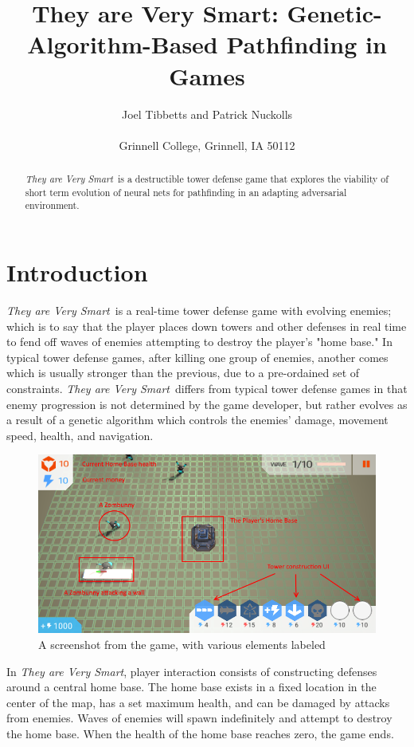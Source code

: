 \documentclass[letterpaper]{article}
\title{They are Very Smart: Genetic-Algorithm-Based Pathfinding in Games}
\author{Joel Tibbetts and Patrick Nuckolls\\
\mbox{}\\
Grinnell College, Grinnell, IA 50112 \\
} %
\def\tavs{\textit{They are Very Smart}}
\begin{document}
\maketitle

\begin{abstract}
\tavs~is a destructible tower defense game that explores the viability of short term evolution of neural nets for pathfinding in an adapting adversarial environment.
\end{abstract}

\section{Introduction}
\tavs~is a real-time tower defense game with evolving enemies; which is to say that the player places down towers and other defenses in real time to fend off waves of enemies attempting to destroy the player's "home base." In typical tower defense games, after killing one group of enemies, another comes which is usually stronger than the previous, due to a pre-ordained set of constraints. \tavs~differs from typical tower defense games in that enemy progression is not determined by the game developer, but rather evolves as a result of a genetic algorithm which controls the enemies' damage, movement speed, health, and navigation.

\begin{figure}[h]
	\includegraphics[width=\columnwidth]{InGameLabeled}
	\caption{A screenshot from the game, with various elements labeled}
\end{figure}

In \tavs, player interaction consists of constructing defenses around a central home base. The home base exists in a fixed location in the center of the map, has a set maximum health, and can be damaged by attacks from enemies. Waves of enemies will spawn indefinitely and attempt to destroy the home base. When the health of the home base reaches zero, the game ends.
\end{document}
